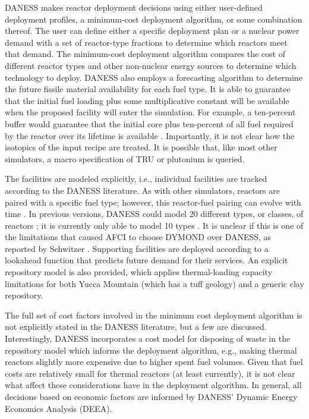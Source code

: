 DANESS makes reactor deployment decisions using either user-defined deployment
profiles, a minimum-cost deployment algorithm, or some combination thereof. The
user can define either a specific deployment plan or a nuclear power demand with
a set of reactor-type fractions to determine which reactors meet that
demand. The minimum-cost deployment algorithm compares the cost of different
reactor types and other non-nuclear energy sources to determine which technology
to deploy. DANESS also employs a forecasting algorithm to determine the future
fissile material availability for each fuel type. It is able to guarantee that
the initial fuel loading plus some multiplicative constant will be available
when the proposed facility will enter the simulation. For example, a ten-percent
buffer would guarantee that the initial core plus ten-percent of all fuel
required by the reactor over its lifetime is available
\cite{guerin_benchmark_2009}. Importantly, it is not clear how the isotopics of
the input recipe are treated. It is possible that, like most other simulators, a
macro specification of TRU or plutonium is queried.

The facilities are modeled explicitly, i.e., individual facilities are tracked
according to the DANESS literature. As with other simulators, reactors are
paired with a specific fuel type; however, this reactor-fuel pairing can evolve
with time \cite{durpel_daness_2003}. In previous versions, DANESS could model 20
different types, or classes, of reactors \cite{van_den_durpel_daness_2009}; it
is currently only able to model 10 types \cite{durpel_daness_2003}. It is
unclear if this is one of the limitations that caused AFCI to choose DYMOND over
DANESS, as reported by Schwitzer \cite{schweitzer_improved_2008}. Supporting
facilities are deployed according to a lookahead function that predicts future
demand for their services. An explicit repository model is also provided, which
applies thermal-loading capacity limitations for both Yucca Mountain (which has
a tuff geology) and a generic clay repository.

The full set of cost factors involved in the minimum cost deployment algorithm
is not explicitly stated in the DANESS literature, but a few are
discussed. Interestingly, DANESS incorporates a cost model for disposing of
waste in the repository model which informs the deployment algorithm,
e.g., making thermal reactors slightly more expensive due to higher spent fuel
volumes. Given that fuel costs are relatively small for thermal reactors (at
least currently), it is not clear what affect these considerations have in the
deployment algorithm. In general, all decisions based on economic factors are
informed by DANESS' Dynamic Energy Economics Analysis (DEEA).

